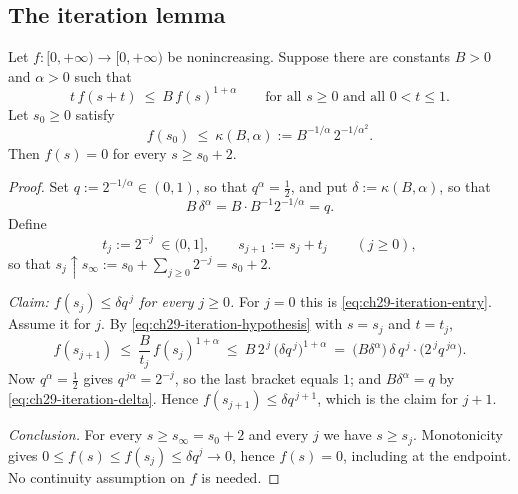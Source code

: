 \subsection{The iteration lemma}
\label{sec:ch29-iteration-lemma}

\begin{lemma}
\label{lem:ch29-iteration}
Let $f:[0,+\infty)\to[0,+\infty)$ be nonincreasing.
Suppose there are constants $B>0$ and
$\alpha>0$ such that
\begin{equation}
\label{eq:ch29-iteration-hypothesis}
 t\,f(s+t)\ \leq\ B\,f(s)^{1+\alpha}
 \qquad\text{for all }s\geq0\text{ and all }0<t\leq1 .
\end{equation}
Let $s_0\geq0$ satisfy
\begin{equation}
\label{eq:ch29-iteration-entry}
 f(s_0)\ \leq\ \kappa(B,\alpha):=B^{-1/\alpha}\,2^{-1/\alpha^2}.
\end{equation}
Then $f(s)=0$ for every $s\geq s_0+2$.
\end{lemma}

\begin{proof}
Set $q:=2^{-1/\alpha}\in(0,1)$, so that $q^\alpha=\tfrac12$, and put
$\delta:=\kappa(B,\alpha)$, so that
\begin{equation}
\label{eq:ch29-iteration-delta}
 B\,\delta^\alpha=B\cdot B^{-1}2^{-1/\alpha}=q .
\end{equation}
Define
\[
 t_j:=2^{-j}\ \in(0,1],\qquad
 s_{j+1}:=s_j+t_j\qquad(j\geq0),
\]
so that $s_j\uparrow s_\infty:=s_0+\sum_{j\geq0}2^{-j}=s_0+2$.

\emph{Claim: $f(s_j)\leq\delta q^{\,j}$ for every $j\geq0$.}  For
$j=0$ this is \eqref{eq:ch29-iteration-entry}.  Assume it for $j$.  By
\eqref{eq:ch29-iteration-hypothesis} with $s=s_j$ and $t=t_j$,
\[
 f(s_{j+1})\ \leq\ \frac{B}{t_j}\,f(s_j)^{1+\alpha}
 \ \leq\ B\,2^{\,j}\,\bigl(\delta q^{\,j}\bigr)^{1+\alpha}
 \ =\ \bigl(B\delta^{\alpha}\bigr)\,\delta\,
       q^{\,j}\cdot\bigl(2^{\,j}q^{\,j\alpha}\bigr).
\]
Now $q^{\alpha}=\tfrac12$ gives $q^{\,j\alpha}=2^{-j}$, so the last
bracket equals $1$; and $B\delta^\alpha=q$ by
\eqref{eq:ch29-iteration-delta}.  Hence
$f(s_{j+1})\leq\delta q^{\,j+1}$, which is the claim for $j+1$.

\emph{Conclusion.}  For every $s\geq s_\infty=s_0+2$ and every
$j$ we have $s\geq s_j$.  Monotonicity gives
$0\leq f(s)\leq f(s_j)\leq\delta q^j\to0$, hence $f(s)=0$,
including at the endpoint.  No continuity assumption on $f$ is needed.
\end{proof}

